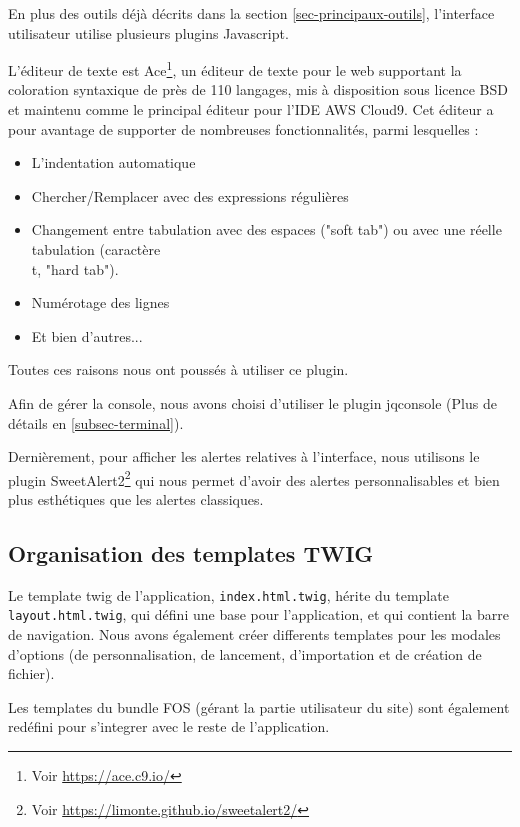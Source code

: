 En plus des outils déjà décrits dans la section \ref{sec-principaux-outils}, l'interface utilisateur utilise plusieurs plugins Javascript.

L'éditeur de texte est Ace\footnote{Voir \url{https://ace.c9.io/}}, un éditeur de texte pour le web supportant la coloration syntaxique de près de 110 langages, mis à disposition sous licence BSD et maintenu comme le principal éditeur pour l'IDE AWS Cloud9. Cet éditeur a pour avantage de supporter de nombreuses fonctionnalités, parmi lesquelles :
\

\begin{itemize}
  \item L'indentation automatique
  \item Chercher/Remplacer avec des expressions régulières
  \item Changement entre tabulation avec des espaces ("soft tab") ou avec une réelle tabulation (caractère \\t, "hard tab").
  \item Numérotage des lignes
  \item Et bien d'autres...
\end{itemize}

Toutes ces raisons nous ont poussés à utiliser ce plugin.

Afin de gérer la console, nous avons choisi d'utiliser le plugin jqconsole (Plus de détails en \ref{subsec-terminal}).

Dernièrement, pour afficher les alertes relatives à l'interface, nous utilisons le plugin SweetAlert2\footnote{Voir \url{https://limonte.github.io/sweetalert2/}} qui nous permet d'avoir des alertes personnalisables et bien plus esthétiques que les alertes classiques.

\subsection{Organisation des templates TWIG}

Le template twig de l'application, \texttt{index.html.twig}, hérite du template \texttt{layout.html.twig}, qui défini une base pour l'application, et qui contient la barre de navigation. Nous avons également créer differents templates pour les modales d'options (de personnalisation, de lancement, d'importation et de création de fichier).

Les templates du bundle FOS (gérant la partie utilisateur du site) sont également redéfini pour s'integrer avec le reste de l'application.

